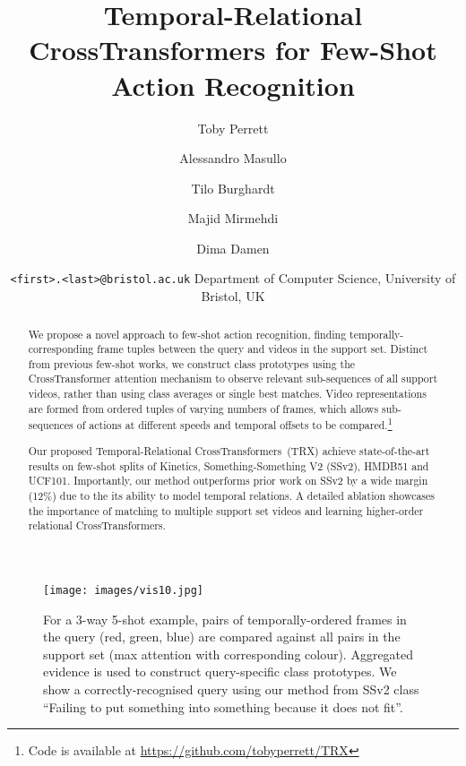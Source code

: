 \documentclass[final]{cvpr}
\begin{document}
\title{Temporal-Relational CrossTransformers for Few-Shot Action Recognition}

\author{Toby Perrett
\and Alessandro Masullo \and Tilo Burghardt \and Majid Mirmehdi \and Dima Damen \and 

{\tt\small <first>.<last>@bristol.ac.uk} \quad Department of Computer Science, University of Bristol, UK
}


\maketitle





\begin{abstract}
We propose a novel approach to few-shot action recognition, finding temporally-corresponding frame tuples between the query and videos in the support set. Distinct from previous few-shot works, we construct class prototypes using the CrossTransformer attention mechanism to observe relevant sub-sequences of all support videos, rather than using class averages or single best matches. Video representations are formed from ordered tuples of varying numbers of frames, which allows sub-sequences of actions at different speeds and temporal offsets to be compared.\footnote{Code is available at \url{https://github.com/tobyperrett/TRX}
} 

Our proposed Temporal-Relational CrossTransformers~(TRX) achieve state-of-the-art results on few-shot splits of Kinetics, Something-Something V2 (SSv2), HMDB51 and UCF101.  Importantly, our method outperforms prior work on SSv2 by a wide margin (12\%) due to the its ability to model temporal relations. A detailed ablation showcases the importance of matching to multiple support set videos and learning higher-order relational CrossTransformers.
\end{abstract}


\begin{figure}
\vspace{-2mm}
\centering
\texttt{[image: images/vis10.jpg]}
\caption{For a 3-way 5-shot example, pairs of temporally-ordered frames in the query (red, green, blue) are compared against all pairs in the support set (max attention with corresponding colour). Aggregated evidence is used to construct query-specific class prototypes. We show a correctly-recognised query using our method from SSv2 class ``Failing to put something into something because it does not fit''. \vspace{-8mm}
}
\label{fig:vis}
\end{figure}
\end{document}
